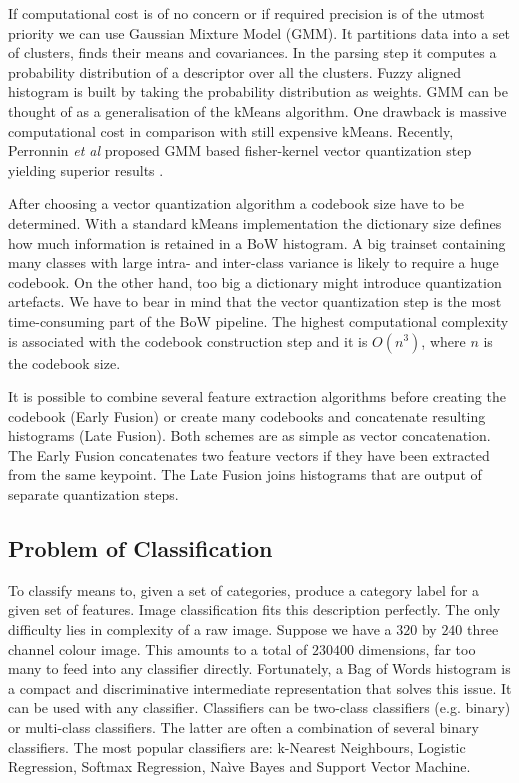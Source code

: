\documentclass[12pt]{article}
\begin{document}
    If computational cost is of no concern or if required precision is of the 
utmost priority we can use Gaussian Mixture Model (GMM). It partitions data 
into a set of clusters, finds their means and covariances. In the parsing step 
it computes a probability distribution of a descriptor over all the clusters. 
Fuzzy aligned histogram is built by taking the probability distribution as 
weights. GMM can be thought of as a generalisation of the kMeans algorithm. One 
drawback is massive computational cost in comparison with still expensive 
kMeans. Recently, Perronnin \textit{et al} proposed GMM based fisher-kernel 
vector quantization step yielding superior results \cite{fisher1, fisher2}.	
	
    After choosing a vector quantization algorithm a codebook size have to be 
determined. With a standard kMeans implementation the dictionary size defines 
how much information is retained in a BoW histogram. A big trainset containing 
many classes with large intra- and inter-class variance is likely to 
require a huge codebook. On the other hand, too big a dictionary might 
introduce quantization artefacts. We have to bear in mind that the vector 
quantization step is the most time-consuming part of the BoW pipeline. The 
highest computational complexity is associated with the codebook construction 
step and it is $O(n^3)$, where $n$ is the codebook size.		
    
    It is possible to combine several feature extraction algorithms before 
creating the codebook (Early Fusion) or create many codebooks and concatenate 
resulting histograms (Late Fusion). Both schemes are as simple as vector 
concatenation. The Early Fusion concatenates two feature vectors if they have 
been extracted from the same keypoint. The Late Fusion joins histograms that 
are output of separate quantization steps.
	      
\subsection{Problem of Classification}

    To classify means to, given a set of categories, produce a category label 
for a given set of features. Image classification fits this 
description perfectly. The only difficulty lies in complexity of a raw image. 
Suppose we have a $320$ by $240$ three channel colour image. This amounts to a 
total of $230400$ dimensions, far too many to feed into any classifier 
directly. Fortunately, a Bag of Words histogram is a compact and discriminative 
intermediate representation that solves this issue. It can be used with any 
classifier. Classifiers can be two-class classifiers (e.g. binary) or 
multi-class classifiers. The latter are often a combination of several binary 
classifiers. The most popular classifiers are: k-Nearest Neighbours, Logistic 
Regression, Softmax Regression, Na\`ive Bayes and Support Vector Machine.
\end{document}
